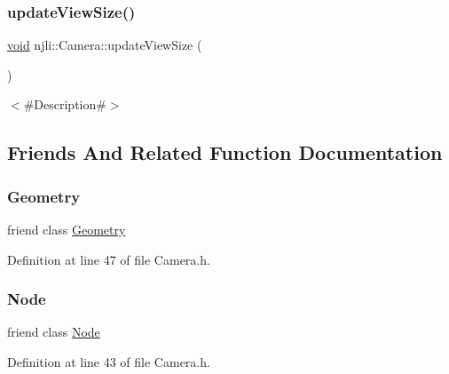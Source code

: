 \subsubsection{\texorpdfstring{update\+View\+Size()}{updateViewSize()}}
{\footnotesize\ttfamily \mbox{\hyperlink{_thread_8h_af1e856da2e658414cb2456cb6f7ebc66}{void}} njli\+::\+Camera\+::update\+View\+Size (\begin{DoxyParamCaption}{ }\end{DoxyParamCaption})}

$<$\#\+Description\#$>$ 

\subsection{Friends And Related Function Documentation}
\mbox{\label{classnjli_1_1_camera_a9aca7b7350e6ffa0e2d6320834ad1857}} 
\subsubsection{\texorpdfstring{Geometry}{Geometry}}
{\footnotesize\ttfamily friend class \mbox{\hyperlink{classnjli_1_1_geometry}{Geometry}}\hspace{0.3cm}{\ttfamily [friend]}}



Definition at line 47 of file Camera.\+h.

\mbox{\label{classnjli_1_1_camera_a6db9d28bd448a131448276ee03de1e6d}} 
\subsubsection{\texorpdfstring{Node}{Node}}
{\footnotesize\ttfamily friend class \mbox{\hyperlink{classnjli_1_1_node}{Node}}\hspace{0.3cm}{\ttfamily [friend]}}



Definition at line 43 of file Camera.\+h.

\mbox{\label{classnjli_1_1_camera_af60c965608a88762c5d3b48490472319}} 
